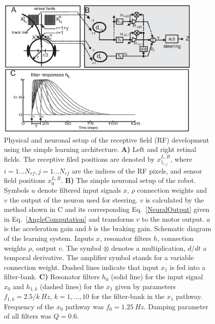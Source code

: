 \begin{figure}[!hbt]
	\begin{center}
		\includegraphics[width=0.9\textwidth]{figures/ppmeasure/2}
	\end{center}
	\caption[Retinal robot setup]{ Physical and neuronal setup of the receptive field
          (RF) development using the simple learning
          architecture. {\bf A)} Left and right retinal fields. The
          receptive filed positions are denoted by
          $x_{1_{i,j}}^{L,R}$, where $i=1 \ldots N_{rf}, j=1 \ldots
          N_{rf}$ are the indices of the RF pixels, and sensor field
          positions $x_0^{L,R}$. {\bf B)} The simple neuronal setup of
          the robot. Symbols $u$ 
          denote filtered input signals $x$, $\rho$ connection weights
          and $v$ the output of the neuron used for steering. $v$ is
          calculated by the method shown in C and its corresponding
          Eq.~\ref{NeuralOutput} given in Eq.~\ref{AngleComputation}
          and transforms $v$ to the motor output. $a$ is the
          acceleration gain and $b$ is the braking gain. 
          Schematic diagram of the learning system. Inputs $x$,
          resonator filters $h$, connection weights $\rho$, output
          $v$. The symbol $\otimes$ denotes a multiplication, $d/dt$ a
          temporal derivative. The amplifier symbol stands for a
          variable connection weight. Dashed lines indicate that input
          $x_1$ is fed into a filter-bank. {\bf C)} Resonator filters
          $h_0$ (solid line) for the input signal $x_0$ and $h_{1,k}$
          (dashed lines) for the $x_1$ given by parameters
          $f_{1,k}=2.5/k~Hz$, $k=1,\dots ,10$ for the filter-bank in
          the $x_1$ pathway. Frequency of the $x_0$ pathway was
          $f_0=1.25~Hz$. Damping parameter of all filters was
          $Q=0.6$. \label{PPmeasure:Figure2}}
	
\end{figure}



